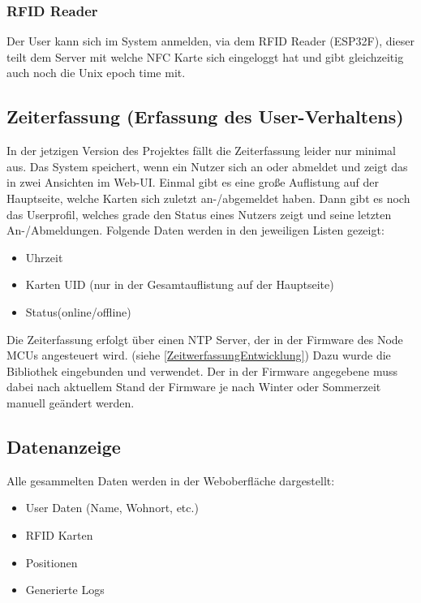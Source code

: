 \documentclass[../main.tex]{subfiles}
\begin{document}
\subsubsection{RFID Reader}

Der User kann sich im System anmelden, via dem RFID Reader (ESP32F), dieser teilt dem Server mit welche NFC Karte sich eingeloggt hat und gibt gleichzeitig auch noch die Unix epoch time mit.

\subsection{Zeiterfassung (Erfassung des User-Verhaltens)} \label{Zeiterfassung}

In der jetzigen Version des Projektes fällt die Zeiterfassung leider nur minimal aus. Das System speichert, wenn ein Nutzer sich an oder abmeldet und zeigt das in zwei Ansichten im Web-UI. Einmal gibt es eine große Auflistung auf der Hauptseite, welche Karten sich zuletzt an-/abgemeldet haben. Dann gibt es noch das Userprofil, welches grade den Status eines Nutzers zeigt und seine letzten An-/Abmeldungen. Folgende Daten werden in den jeweiligen Listen gezeigt:

\begin{itemize}
  \item Uhrzeit
  \item Karten UID (nur in der Gesamtauflistung auf der Hauptseite)
  \item Status(online/offline)
\end{itemize}

\noindent Die Zeiterfassung erfolgt über einen NTP Server, der in der Firmware des Node MCUs angesteuert wird. (siehe \ref{ZeitwerfassungEntwicklung}) Dazu wurde die  Bibliothek eingebunden und verwendet. Der in der Firmware angegebene  muss dabei nach aktuellem Stand der Firmware je nach Winter oder Sommerzeit manuell geändert werden.

\subsection{Datenanzeige}

Alle gesammelten Daten werden in der Weboberfläche dargestellt:

\begin{itemize}
  \item User Daten (Name, Wohnort, etc.)
  \item RFID Karten
  \item Positionen
  \item Generierte Logs
\end{itemize}
\end{document}
